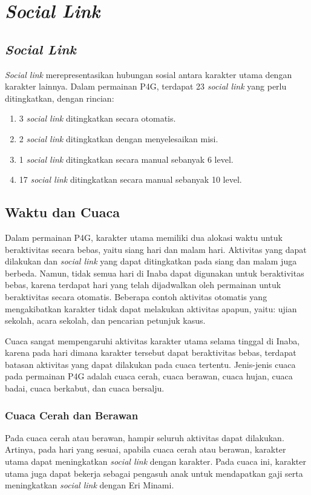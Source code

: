\chapter{\textit{Social Link}}
\section{\textit{Social Link}}
\textit{Social link} merepresentasikan hubungan sosial antara karakter utama dengan karakter lainnya. Dalam permainan P4G, terdapat 23 \textit{social link} yang perlu ditingkatkan, dengan rincian:
\begin{enumerate}
    \item 3 \textit{social link} ditingkatkan secara otomatis.
    \item 2 \textit{social link} ditingkatkan dengan menyelesaikan misi.
    \item 1 \textit{social link} ditingkatkan secara manual sebanyak 6 level.
    \item 17 \textit{social link} ditingkatkan secara manual sebanyak 10 level.
\end{enumerate}

\section{Waktu dan Cuaca}
Dalam permainan P4G, karakter utama memiliki dua alokasi waktu untuk beraktivitas secara bebas, yaitu siang hari dan malam hari. Aktivitas yang dapat dilakukan dan \textit{social link} yang dapat ditingkatkan pada siang dan malam juga berbeda.
Namun, tidak semua hari di Inaba dapat digunakan untuk beraktivitas bebas, karena terdapat hari yang telah dijadwalkan oleh permainan untuk beraktivitas secara otomatis.
Beberapa contoh aktivitas otomatis yang mengakibatkan karakter tidak dapat melakukan aktivitas apapun, yaitu: ujian sekolah, acara sekolah, dan pencarian petunjuk kasus.

Cuaca sangat mempengaruhi aktivitas karakter utama selama tinggal di Inaba, karena pada hari dimana karakter tersebut dapat beraktivitas bebas, terdapat batasan aktivitas yang dapat dilakukan pada cuaca tertentu. Jenis-jenis cuaca pada permainan P4G adalah cuaca cerah, cuaca berawan, cuaca hujan, cuaca badai, cuaca berkabut, dan cuaca bersalju.

\subsection{Cuaca Cerah dan Berawan}
Pada cuaca cerah atau berawan, hampir seluruh aktivitas dapat dilakukan. Artinya, pada hari yang sesuai, apabila cuaca cerah atau berawan, karakter utama dapat meningkatkan \textit{social link} dengan karakter. Pada cuaca ini, karakter utama juga dapat bekerja sebagai pengasuh anak untuk mendapatkan gaji serta meningkatkan \textit{social link} dengan Eri Minami.

